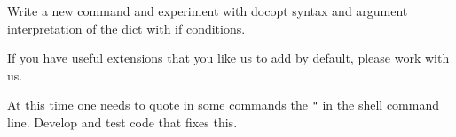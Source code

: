 \begin{exercise}
\label{E:CMD5.3:}
Write a new command and experiment with docopt syntax and argument
interpretation of the dict with if conditions.
\end{exercise}

\begin{exercise}
\label{E:CMD5.4:}
If you have useful extensions that you like us to add by default, please
work with us.
\end{exercise}

\begin{exercise}
\label{E:CMD5.5}
At this time one needs to quote in some commands the \verb|"| in the shell command
line. Develop and test code that fixes this.
\end{exercise}
